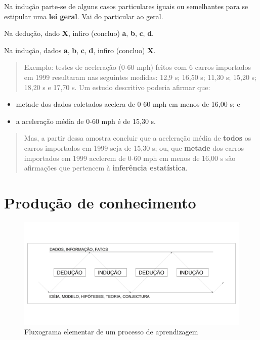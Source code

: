 \documentclass[
]{book}
\providecommand{\tightlist}{%
  \setlength{\itemsep}{0pt}\setlength{\parskip}{0pt}}
\begin{document}
Na indução parte-se de alguns casos particulares iguais ou semelhantes para se estipular uma \textbf{lei geral}. Vai do particular ao geral.

Na dedução, dado \textbf{X}, infiro (concluo) \textbf{a}, \textbf{b}, \textbf{c}, \textbf{d}.

Na indução, dados \textbf{a}, \textbf{b}, \textbf{c}, \textbf{d}, infiro (concluo) \textbf{X}.

\begin{quote}
Exemplo: testes de aceleração (0-60 mph) feitos com 6 carros importados em 1999 resultaram nas seguintes medidas: 12,9 s; 16,50 s; 11,30 s; 15,20 s; 18,20 s e 17,70 s. Um estudo descritivo poderia afirmar que:
\end{quote}

\begin{itemize}
\tightlist
\item
  metade dos dados coletados acelera de 0-60 mph em menos de 16,00 s; e
\item
  a aceleração média de 0-60 mph é de 15,30 s.
\end{itemize}

\begin{quote}
Mas, a partir dessa amostra concluir que a aceleração média de \textbf{todos} os carros importados em 1999 seja de 15,30 s; ou, que \textbf{metade} dos carros importados em 1999 acelerem de 0-60 mph em menos de 16,00 s são afirmações que pertencem à \textbf{inferência estatística}.
\end{quote}

\hypertarget{produuxe7uxe3o-de-conhecimento}{%
\section{Produção de conhecimento}\label{produuxe7uxe3o-de-conhecimento}}

\begin{figure}

{\centering \includegraphics[width=1\linewidth]{images2/flux-george} 

}

\caption{Fluxograma elementar de um processo de aprendizagem}\label{fig:unnamed-chunk-22}
\end{figure}
\end{document}

